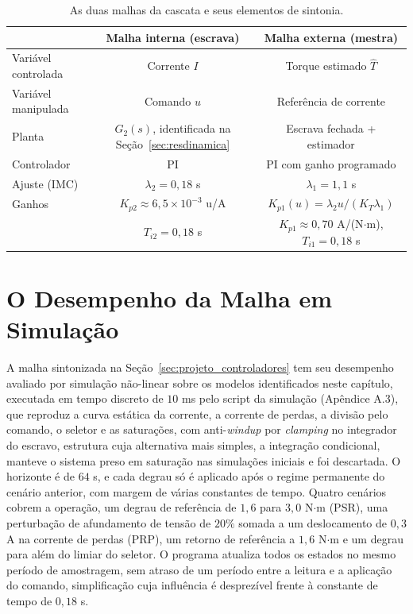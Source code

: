 \begin{table}[htb]
\centering
\caption{As duas malhas da cascata e seus elementos de sintonia.}
\label{tab:malhas}
\small
\renewcommand{\arraystretch}{1.2}
\begin{tabular}{l c c}
\hline
 & Malha interna (escrava) & Malha externa (mestra) \\
\hline
Variável controlada & Corrente $I$ & Torque estimado $\hat{T}$ \\
Variável manipulada & Comando $u$ & Referência de corrente \\
Planta & $G_2(s)$, identificada na Seção~\ref{sec:resdinamica} & Escrava fechada + estimador \\
Controlador & PI & PI com ganho programado \\
Ajuste (IMC) & $\lambda_2 = 0{,}18$ s & $\lambda_1 = 1{,}1$ s \\
Ganhos & $K_{p2} \approx 6{,}5\times10^{-3}$ u/A & $K_{p1}(u) = \lambda_2 u / (K_T \lambda_1)$ \\
 & $T_{i2} = 0{,}18$ s & $K_{p1} \approx 0{,}70$ A/(N$\cdot$m), $T_{i1} = 0{,}18$ s \\
\hline
\end{tabular}
\end{table}

\section{O Desempenho da Malha em Simulação}
\label{sec:ressimulacao}

A malha sintonizada na Seção~\ref{sec:projeto_controladores} tem seu desempenho avaliado
por simulação não-linear sobre os modelos identificados neste capítulo, executada em tempo
discreto de $10$ ms pelo script da simulação (Apêndice A.3), que reproduz a curva
estática da corrente, a corrente de perdas, a divisão pelo comando, o seletor e as
saturações, com anti-\emph{windup} por \emph{clamping} no integrador do escravo, estrutura
cuja alternativa mais simples, a integração condicional, manteve o sistema preso em
saturação nas simulações iniciais e foi descartada. O horizonte é de $64$ s, e cada degrau só é aplicado após o regime
permanente do cenário anterior, com margem de várias constantes de tempo. Quatro cenários
cobrem a operação, um degrau de referência de $1{,}6$ para
$3{,}0$ N$\cdot$m (PSR), uma perturbação de afundamento de tensão de $20\%$ somada a um
deslocamento de $0{,}3$ A na corrente de perdas (PRP), um retorno de referência a $1{,}6$
N$\cdot$m e um degrau para além do limiar do seletor. O programa atualiza todos os
estados no mesmo período de amostragem, sem atraso de um período entre a leitura e a
aplicação do comando, simplificação cuja influência é desprezível frente à constante de
tempo de $0{,}18$ s.

